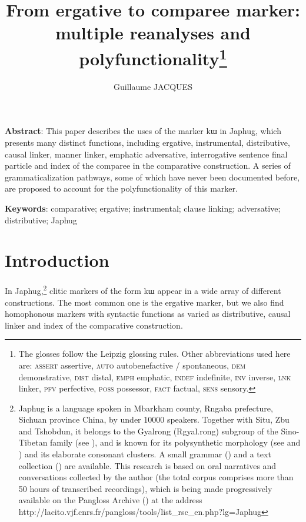 \documentclass[oldfontcommands,oneside,a4paper,11pt]{article}
\newcommand{\ipa}[1]{{\phon #1}} %
\begin{document}
 

\title{From ergative to comparee marker: multiple reanalyses and polyfunctionality\footnote{The glosses follow the Leipzig glossing rules. Other abbreviations used here are:   \textsc{assert} assertive, \textsc{auto} autobenefactive / spontaneous,  \textsc{dem} demonstrative, \textsc{dist} distal, \textsc{emph} emphatic, \textsc{indef} indefinite, \textsc{inv} inverse,  \textsc{lnk} linker, \textsc{pfv} perfective, \textsc{poss} possessor, \textsc{fact} factual,  \textsc{sens} sensory.} }

\author{Guillaume JACQUES}
\maketitle
   \sloppy
\textbf{Abstract}: This paper describes the uses of the marker  \ipa{kɯ} in Japhug, which presents many distinct functions, including ergative, instrumental, distributive, causal linker, manner linker, emphatic adversative, interrogative sentence final particle and index of the comparee in the comparative construction. A series of grammaticalization pathways, some of which have never been documented before, are proposed to account for the polyfunctionality of this marker.

\textbf{Keywords}: comparative; ergative; instrumental; clause linking; adversative; distributive; Japhug
  
\section{Introduction}
  
 
 
In Japhug,\footnote{Japhug is a language spoken in Mbarkham county, Rngaba prefecture, Sichuan province China, by under 10000 speakers. Together with Situ, Zbu and Tshobdun, it belongs to the Gyalrong (Rgyal.rong) subgroup of the Sino-Tibetan family (see \citealt{jackson00sidaba}), and is known for its polysynthetic morphology (see \citealt{jacques13harmonization} and  \citealt{jacques14antipassive}) and its elaborate consonant clusters. A small grammar  (\citealt{jacques08zh}) and a text collection (\citealt{jacques10gesar}) are available.  This research is based on oral narratives and conversations collected by the author (the total corpus comprises more than 50 hours of transcribed recordings), which is being made progressively available on the Pangloss Archive (\citealt{michailovsky14pangloss}) at the address http://lacito.vjf.cnrs.fr/pangloss/tools/list\_rsc\_en.php?lg=Japhug } clitic markers of the form \ipa{kɯ} appear in a wide array of different constructions. The most common one is the ergative marker, but we also find homophonous markers with syntactic functions as varied as distributive, causal linker  and  index of the comparative construction. 
\end{document}
